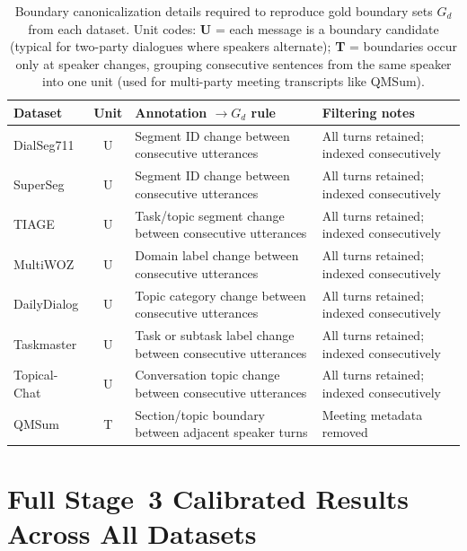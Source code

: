 {

\begin{table}[t]
\centering
\small
\setlength{\tabcolsep}{6pt}
\begin{tabularx}{\linewidth}{
l
c
>{\raggedright\arraybackslash}X
>{\raggedright\arraybackslash}X
}
\toprule
Dataset &
Unit &
Annotation $\rightarrow G_d$ rule &
Filtering notes \\
\midrule
DialSeg711 & U &
Segment ID change between consecutive utterances &
All turns retained; indexed consecutively \\

SuperSeg & U &
Segment ID change between consecutive utterances &
All turns retained; indexed consecutively \\

TIAGE & U &
Task/topic segment change between consecutive utterances &
All turns retained; indexed consecutively \\

MultiWOZ & U &
Domain label change between consecutive utterances &
All turns retained; indexed consecutively \\

DailyDialog & U &
Topic category change between consecutive utterances &
All turns retained; indexed consecutively \\

Taskmaster & U &
Task or subtask label change between consecutive utterances &
All turns retained; indexed consecutively \\

Topical-Chat & U &
Conversation topic change between consecutive utterances &
All turns retained; indexed consecutively \\

QMSum & T &
Section/topic boundary between adjacent speaker turns &
Meeting metadata removed \\
\bottomrule
\end{tabularx}
\caption{Boundary canonicalization details required to reproduce gold
boundary sets $G_d$ from each dataset.
Unit codes: \textbf{U} = each message is a boundary candidate (typical for two-party dialogues where speakers alternate);
\textbf{T} = boundaries occur only at speaker changes, grouping consecutive sentences from the same speaker into one unit (used for multi-party meeting transcripts like QMSum).}
\label{tab:canon}
\end{table}
}

\section{Full Stage~3 Calibrated Results Across All Datasets}
\label{app:stage3}

